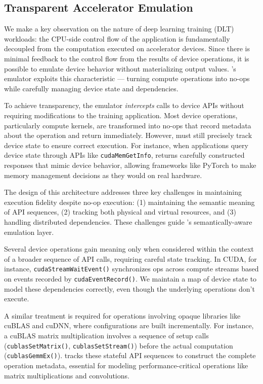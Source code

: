 \subsection{Transparent Accelerator Emulation}
We make a key observation on the nature of deep learning training (DLT) workloads: the CPU-side control flow of the application is fundamentally decoupled from the computation executed on accelerator devices. Since there is minimal feedback to the control flow from the results of device operations, it is possible to emulate device behavior without materializing output values. \sysname's emulator exploits this characteristic --- turning compute operations into no-ops while carefully managing device state and dependencies.


To achieve transparency, the emulator \textit{intercepts} calls to device APIs without requiring modifications to the training application. Most device operations, particularly compute kernels, are transformed into no-ops that record metadata about the operation and return immediately. However, \sysname must still precisely track  device state to ensure correct execution. For instance, when applications query device state through APIs like \texttt{cudaMemGetInfo}, \sysname returns carefully constructed responses that mimic device behavior, allowing frameworks like PyTorch to make memory management decisions as they would on real hardware.

The design of this architecture addresses three key challenges in maintaining execution fidelity despite no-op execution: (1) maintaining the semantic meaning of API sequences, (2) tracking both physical and virtual resources, and (3) handling distributed dependencies. These challenges guide \sysname's semantically-aware emulation layer.

 Several device operations gain meaning only when considered within the context of a broader sequence of API calls, requiring careful state tracking. In CUDA, for instance, \texttt{cudaStreamWaitEvent()} synchronizes ops across compute streams based on events recorded by \texttt{cudaEventRecord()}. We maintain a map of device state to model these dependencies correctly, even though the underlying operations don't execute.

A similar treatment is required for operations involving opaque libraries like cuBLAS and cuDNN, where configurations are built incrementally. For instance, a cuBLAS matrix multiplication involves a sequence of setup calls (\texttt{cublasSetMatrix()}, \texttt{cublasSetStream()}) before the actual computation (\texttt{cublasGemmEx()}). \sysname tracks these stateful API sequences to construct the complete operation metadata, essential for modeling performance-critical operations like matrix multiplications and convolutions.

